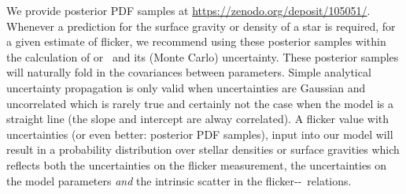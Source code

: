 We provide posterior PDF samples at \url{https://zenodo.org/deposit/105051/}.
Whenever a prediction for the surface gravity or density of a star is required,
for a given estimate of flicker, we recommend using these posterior samples
within the calculation of \rhostar or \logg\ and its (Monte Carlo)
uncertainty.
These posterior samples will naturally fold in the covariances between
parameters.
Simple analytical uncertainty propagation is only valid when uncertainties are
Gaussian and uncorrelated which is rarely true and certainly not the case when
the model is a straight line (the slope and intercept are alway correlated).
A flicker value with uncertainties (or even better: posterior PDF
samples), input into our model will result in a probability distribution over
stellar densities or surface gravities which reflects both the uncertainties
on the flicker measurement, the uncertainties on the model parameters {\it and}
the intrinsic scatter in the flicker-\rhostar-\logg\ relations.
